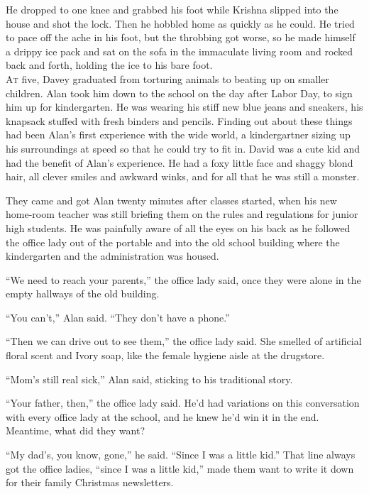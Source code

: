 \documentclass{article}
\begin{document}
He dropped to one knee and grabbed his foot while Krishna slipped into
the house and shot the lock.  Then he hobbled home as quickly as he
could.  He tried to pace off the ache in his foot, but the throbbing
got worse, so he made himself a drippy ice pack and sat on the sofa in
the immaculate living room and rocked back and forth, holding the ice
to his bare foot.
\\
\lettrine[lines=3, lhang=.5, nindent=0pt, findent=2pt]{A}{t} five, Davey graduated from torturing animals to beating up on
smaller children.  Alan took him down to the school on the day after
Labor Day, to sign him up for kindergarten.  He was wearing his stiff
new blue jeans and sneakers, his knapsack stuffed with fresh binders
and pencils.  Finding out about these things had been Alan's first
experience with the wide world, a kindergartner sizing up his
surroundings at speed so that he could try to fit in.  David was a
cute kid and had the benefit of Alan's experience.  He had a foxy
little face and shaggy blond hair, all clever smiles and awkward
winks, and for all that he was still a monster.

They came and got Alan twenty minutes after classes started, when his
new home-room teacher was still briefing them on the rules and
regulations for junior high students.  He was painfully aware of all
the eyes on his back as he followed the office lady out of the
portable and into the old school building where the kindergarten and
the administration was housed.

``We need to reach your parents,'' the office lady said, once they
were alone in the empty hallways of the old building.

``You can't,'' Alan said.  ``They don't have a phone.''

``Then we can drive out to see them,'' the office lady said.  She
smelled of artificial floral scent and Ivory soap, like the female
hygiene aisle at the drugstore.

``Mom's still real sick,'' Alan said, sticking to his traditional
story.

``Your father, then,'' the office lady said.  He'd had variations on
this conversation with every office lady at the school, and he knew
he'd win it in the end.  Meantime, what did they want?

``My dad's, you know, gone,'' he said.  ``Since I was a little kid.''
That line always got the office ladies, ``since I was a little kid,''
made them want to write it down for their family Christmas
newsletters.
\end{document}
